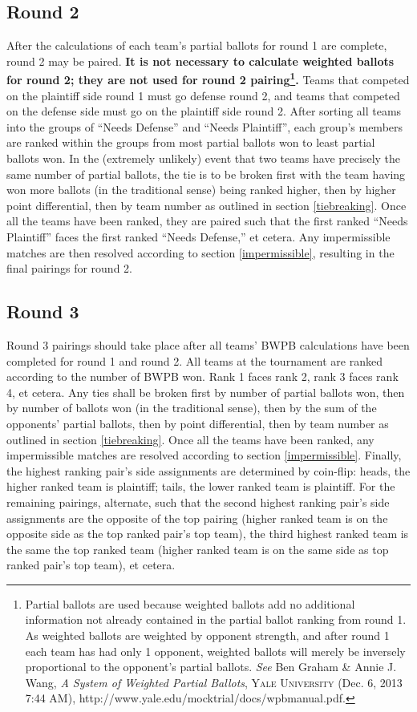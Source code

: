 \documentclass{article}
\begin{document}
\subsection{Round 2}
After the calculations of each team's partial ballots for round 1 are complete, round 2 may be paired.  \textbf{It is not necessary to calculate weighted ballots for round 2; they are not used for round 2 pairing\footnote{Partial ballots are used because weighted ballots add no additional information not already contained in the partial ballot ranking from round 1.  As weighted ballots are weighted by opponent strength, and after round 1 each team has had only 1 opponent, weighted ballots will merely be inversely proportional to the opponent's partial ballots.  \textit{See} Ben Graham \& Annie J. Wang, \textit{A System of Weighted Partial Ballots}, \textsc{Yale University} (Dec. 6, 2013 7:44 AM), http://www.yale.edu/mocktrial/docs/wpbmanual.pdf.}.}  Teams that competed on the plaintiff side round 1 must go defense round 2, and teams that competed on the defense side must go on the plaintiff side round 2.  After sorting all teams into the groups of ``Needs Defense'' and ``Needs Plaintiff'', each group's members are ranked within the groups from most partial ballots won to least partial ballots won.  In the (extremely unlikely) event that two teams have precisely the same number of partial ballots, the tie is to be broken first with the team having won more ballots (in the traditional sense) being ranked higher, then by higher point differential, then by team number as outlined in section \ref{tiebreaking}.  Once all the teams have been ranked, they are paired such that the first ranked ``Needs Plaintiff'' faces the first ranked ``Needs Defense,'' et cetera.  Any impermissible matches are then resolved according to section \ref{impermissible}, resulting in the final pairings for round 2.
\subsection{Round 3}
Round 3 pairings should take place after all teams' BWPB calculations have been completed for round 1 and round 2.  All teams at the tournament are ranked according to the number of BWPB won.  Rank 1 faces rank 2, rank 3 faces rank 4, et cetera.  Any ties shall be broken first by number of partial ballots won, then by number of ballots won (in the traditional sense), then by the sum of the opponents' partial ballots, then by point differential, then by team number as outlined in section \ref{tiebreaking}.  Once all the teams have been ranked, any impermissible matches are resolved according to section \ref{impermissible}. Finally, the highest ranking pair's side assignments are determined by coin-flip: heads, the higher ranked team is plaintiff; tails, the lower ranked team is plaintiff. For the remaining pairings, alternate, such that the second highest ranking pair's side assignments are the opposite of the top pairing (higher ranked team is on the opposite side as the top ranked pair's top team), the third highest ranked team is the same the top ranked team (higher ranked team is on the same side as top ranked pair's top team), et cetera.
\end{document}
